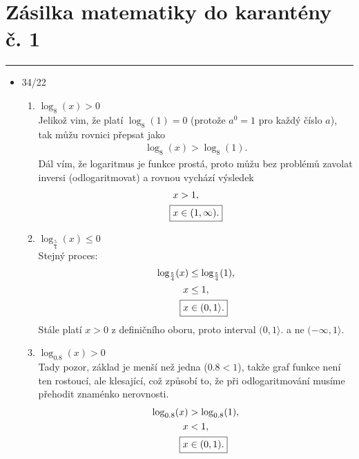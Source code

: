 \documentclass[11pt,a4paper]{report}
\begin{document}
	
	
	\section*{Zásilka matematiky do karantény č. 1}
	\noindent\rule{12cm}{0.2pt}
	
	\begin{itemize}
		
		\item 34/22
			\begin{enumerate}
				
				\item $\log_8(x) > 0$ \\
					Jelikož vim, že platí $\log_8(1) = 0$ (protože $a^0 = 1$ pro každý číslo $a$), tak můžu rovnici přepsat jako
					\begin{align*}
						\log_8(x) > \log_8(1).
					\end{align*}
					Dál vím, že logaritmus je funkce prostá, proto můžu bez problémů zavolat inversi (odlogaritmovat) a rovnou vychází výsledek
					\begin{align*}
						x &> 1,
					\\
						\Aboxed{x &\in (1, \infty).}
					\end{align*}
				
				\item $\log_{\frac 54}(x) \leq 0$ \\
					Stejný proces:
					\begin{align*}
						\log_{\frac 54}(x) &\leq \log_{\frac 54}(1),
					\\
						x &\leq 1,
					\\
						\Aboxed{x &\in (0, 1 \rangle.}
					\end{align*}
					Stále platí $x > 0$ z definičního oboru, proto interval $(0, 1 \rangle.$ a ne $(-\infty, 1 \rangle.$
				
				\item $\log_{0.8}(x) > 0$ \\
					Tady pozor, základ je menší než jedna ($0.8 < 1$), takže graf funkce není ten rostoucí, ale klesající, což způsobí to, že při odlogaritmování musíme přehodit znaménko nerovnosti.
					\begin{align*}
						\log_{0.8}(x) &> \log_{0.8}(1),
					\\
						x &< 1,
					\\
						\Aboxed{x &\in (0, 1).}
					\end{align*}
					

\end{enumerate}
\end{itemize}
\end{document}
